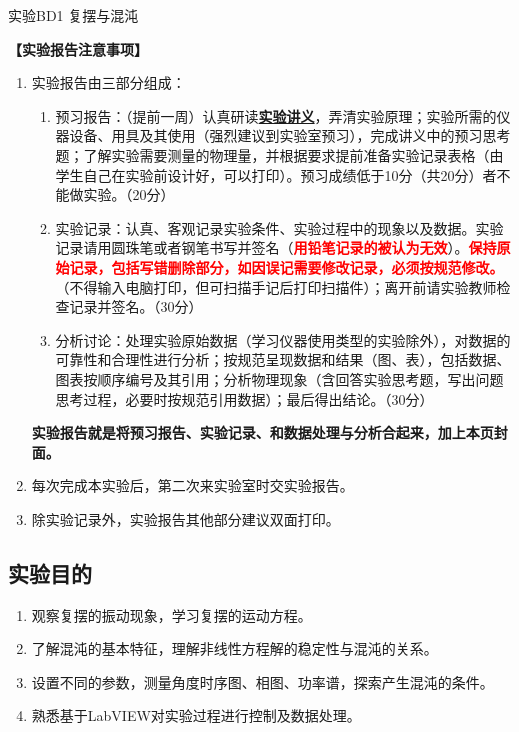 \documentclass[dvipsnames, svgnames,a4paper,11pt]{article}
\begin{document}
\scoresTable{}{}{}{}{}{}{}{}

\infoTable{}{}{}{}{}{} %

\begin{center}
	\LARGE 实验BD1 \quad 复摆与混沌
\end{center}

\textbf{【实验报告注意事项】}
\begin{enumerate}
	\item 实验报告由三部分组成：
	\begin{enumerate}
		\item 预习报告：（提前一周）认真研读\underline{\textbf{实验讲义}}，弄清实验原理；实验所需的仪器设备、用具及其使用（强烈建议到实验室预习），完成讲义中的预习思考题；了解实验需要测量的物理量，并根据要求提前准备实验记录表格（由学生自己在实验前设计好，可以打印）。预习成绩低于10分（共20分）者不能做实验。（20分）
	    \item 实验记录：认真、客观记录实验条件、实验过程中的现象以及数据。实验记录请用圆珠笔或者钢笔书写并签名（\textcolor{red}{\textbf{用铅笔记录的被认为无效}}）。\textcolor{red}{\textbf{保持原始记录，包括写错删除部分，如因误记需要修改记录，必须按规范修改。}}（不得输入电脑打印，但可扫描手记后打印扫描件）；离开前请实验教师检查记录并签名。（30分）
	    \item 分析讨论：处理实验原始数据（学习仪器使用类型的实验除外），对数据的可靠性和合理性进行分析；按规范呈现数据和结果（图、表），包括数据、图表按顺序编号及其引用；分析物理现象（含回答实验思考题，写出问题思考过程，必要时按规范引用数据）；最后得出结论。（30分）
	\end{enumerate}
	\textbf{实验报告就是将预习报告、实验记录、和数据处理与分析合起来，加上本页封面。}
	\item 每次完成本实验后，第二次来实验室时交实验报告。
	\item 除实验记录外，实验报告其他部分建议双面打印。
\end{enumerate}


\clearpage

\setcounter{section}{0}
	
\subsection{实验目的}
\begin{enumerate}
	\item 观察复摆的振动现象，学习复摆的运动方程。
	\item 了解混沌的基本特征，理解非线性方程解的稳定性与混沌的关系。
	\item 设置不同的参数，测量角度时序图、相图、功率谱，探索产生混沌的条件。
	\item 熟悉基于LabVIEW对实验过程进行控制及数据处理。
\end{enumerate}
\end{document}
